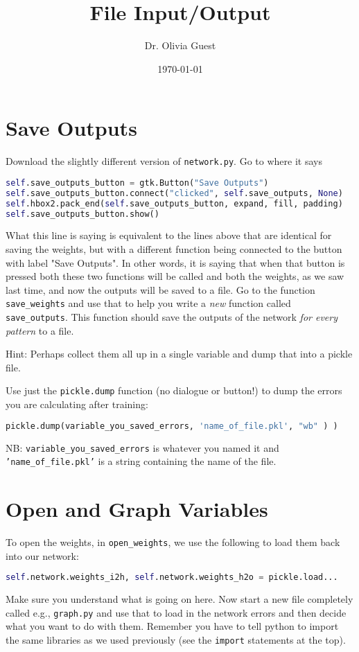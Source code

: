 \documentclass[a4paper,10pt]{article}
\title{File Input/Output}
\author{Dr. Olivia Guest}
\date{\today}
\begin{document}
\maketitle

\section{Save Outputs}
Download the slightly different version of \texttt{network.py}. Go to where it says
\begin{lstlisting}[language=Python]
self.save_outputs_button = gtk.Button("Save Outputs")
self.save_outputs_button.connect("clicked", self.save_outputs, None)
self.hbox2.pack_end(self.save_outputs_button, expand, fill, padding)
self.save_outputs_button.show()
\end{lstlisting}

What this line is saying is equivalent to the lines above that are identical for saving the weights, but with a different function being connected to the button with label "Save Outputs". In other words, it is saying that when that button is pressed both these two functions will be called and both the weights, as we saw last time, and now the outputs will be saved to a file. Go to the function \texttt{save\_weights} and use that to help you write a \emph{new} function called \texttt{save\_outputs}. This function should save the outputs of the network \emph{for every pattern} to a file.

Hint: Perhaps collect them all up in a single variable and dump that into a pickle file.

Use just the \texttt{pickle.dump} function (no dialogue or button!) to dump the errors you are calculating after training:
\begin{lstlisting}[language=Python]
pickle.dump(variable_you_saved_errors, 'name_of_file.pkl', "wb" ) )
\end{lstlisting}
NB: \texttt{variable\_you\_saved\_errors} is whatever you named it and \texttt{'name\_of\_file.pkl'} is a string containing the name of the file.

\section{Open and Graph Variables}
To open the weights, in \texttt{open\_weights}, we use the following to load them back into our network:
\begin{lstlisting}[language=Python]
self.network.weights_i2h, self.network.weights_h2o = pickle.load...
\end{lstlisting}
Make sure you understand what is going on here. Now start a new file completely called e.g., \texttt{graph.py} and use that to load in the network errors and then decide what you want to do with them. Remember you have to tell python to import the same libraries as we used previously (see the \texttt{import} statements at the top). 
\end{document}
